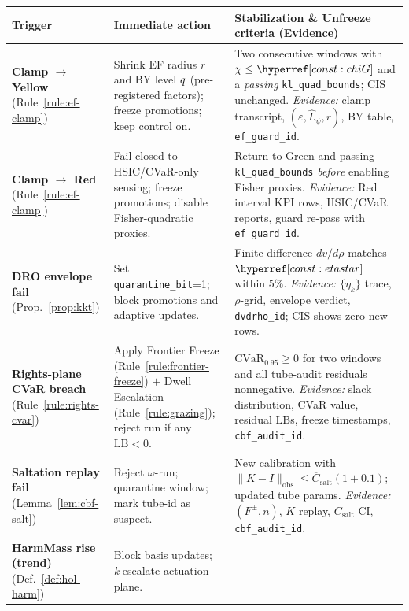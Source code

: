 \begin{table}[t]
\centering
\renewcommand{\arraystretch}{1.1}
\begin{tabularx}{\textwidth}{@{}>{\raggedright\arraybackslash}p{3.0cm} >{\raggedright\arraybackslash}p{4.2cm} >{\raggedright\arraybackslash}X@{}}
\toprule
\textbf{Trigger} & \textbf{Immediate action} & \textbf{Stabilization \& Unfreeze criteria (Evidence)} \\
\midrule
\textbf{Clamp $\to$ Yellow} (Rule~\ref{rule:ef-clamp}) &
Shrink EF radius $r$ and BY level $q$ (pre-registered factors); freeze promotions; keep control on. &
Two consecutive windows with $\chi\le\constref{chiG}$ and a \emph{passing} \texttt{kl\_quad\_bounds}; CIS unchanged. \textit{Evidence:} clamp transcript, $(\varepsilon,\hat L_\psi,r)$, BY table, \texttt{ef\_guard\_id}. \\ \addlinespace
\textbf{Clamp $\to$ Red} (Rule~\ref{rule:ef-clamp}) &
Fail-closed to HSIC/CVaR-only sensing; freeze promotions; disable Fisher-quadratic proxies. &
Return to Green and passing \texttt{kl\_quad\_bounds} \emph{before} enabling Fisher proxies. \textit{Evidence:} Red interval KPI rows, HSIC/CVaR reports, guard re-pass with \texttt{ef\_guard\_id}. \\ \addlinespace
\textbf{DRO envelope fail} (Prop.~\ref{prop:kkt}) &
Set \texttt{quarantine\_bit}=1; block promotions and adaptive updates. &
Finite-difference $dv/d\rho$ matches $\constref{etastar}$ within $5\%$. \textit{Evidence:} $\{\eta_k\}$ trace, $\rho$-grid, envelope verdict, \texttt{dvdrho\_id}; CIS shows zero new rows. \\ \addlinespace
\textbf{Rights-plane CVaR breach} (Rule~\ref{rule:rights-cvar}) &
Apply Frontier Freeze (Rule~\ref{rule:frontier-freeze}) $+$ Dwell Escalation (Rule~\ref{rule:grazing}); reject run if any $\mathrm{LB}<0$. &
$\mathrm{CVaR}_{0.95}\ge 0$ for two windows and all tube-audit residuals nonnegative. \textit{Evidence:} slack distribution, CVaR value, residual LBs, freeze timestamps, \texttt{cbf\_audit\_id}. \\ \addlinespace
\textbf{Saltation replay fail} (Lemma~\ref{lem:cbf-salt}) &
Reject $\omega$-run; quarantine window; mark tube-id as suspect. &
New calibration with $\|K-I\|_{\mathrm{obs}}\le \overline C_{\mathrm{salt}}(1+0.1)$; updated tube params. \textit{Evidence:} $(F^\pm,n)$, $K$ replay, $C_{\mathrm{salt}}$ CI, \texttt{cbf\_audit\_id}. \\ \addlinespace
\textbf{HarmMass rise (trend)} (Def.~\ref{def:hol-harm}) &
Block basis updates; \emph{k}-escalate actuation plane. &

\end{tabularx}
\end{table}
